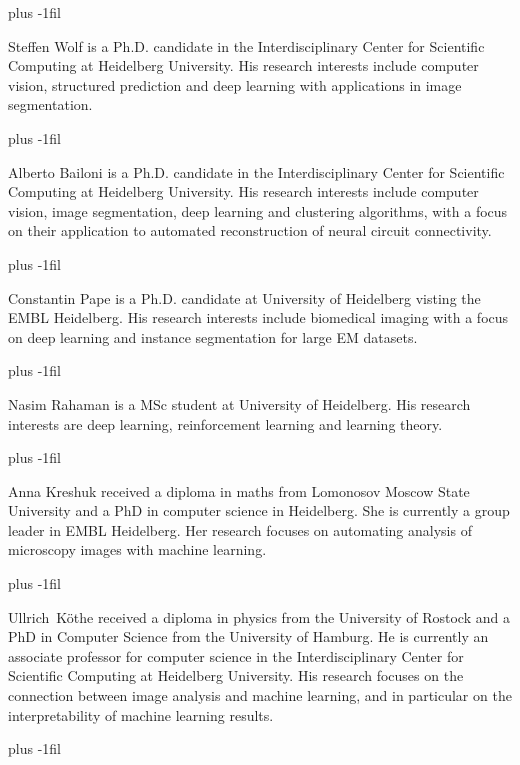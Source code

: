 \vskip 0pt plus -1fil
\begin{IEEEbiography}%
{Steffen Wolf} is a Ph.D. candidate in the Interdisciplinary Center for Scientific Computing at Heidelberg University. His research interests include 
computer vision, structured prediction and deep learning with applications in image segmentation.
\end{IEEEbiography}\vskip 0pt plus -1fil
\begin{IEEEbiography}%
{Alberto Bailoni} is a Ph.D. candidate in the Interdisciplinary Center for Scientific Computing at Heidelberg University. His research interests include computer vision, image segmentation, deep learning and clustering algorithms, with a focus on their application to automated reconstruction of neural circuit connectivity.
\end{IEEEbiography}\vskip 0pt plus -1fil
\begin{IEEEbiography}%
{Constantin Pape} is a Ph.D. candidate at University of Heidelberg visting the EMBL Heidelberg.
His research interests include biomedical imaging with a focus on deep learning and instance segmentation for large EM datasets.
\end{IEEEbiography}\vskip 0pt plus -1fil
\begin{IEEEbiography}%
{Nasim Rahaman} is a MSc student at University of Heidelberg. His research interests are deep learning, reinforcement learning and learning theory.
\end{IEEEbiography}\vskip 0pt plus -1fil
\begin{IEEEbiography}%
{Anna Kreshuk} received a diploma in maths from Lomonosov Moscow State University and a PhD in computer science in Heidelberg. She is currently a group leader in EMBL Heidelberg. Her research focuses on automating analysis of microscopy images with machine learning.
\end{IEEEbiography}\vskip 0pt plus -1fil
\begin{IEEEbiography}%
{Ullrich~K\"othe} received a diploma in physics from the University of Rostock and a PhD in Computer Science from the University of Hamburg. He is currently an associate professor for computer science in the Interdisciplinary Center for Scientific Computing at Heidelberg University. His research focuses on the connection between image analysis and machine learning, and in particular on the interpretability of machine learning results.
\end{IEEEbiography}\vskip 0pt plus -1fil
